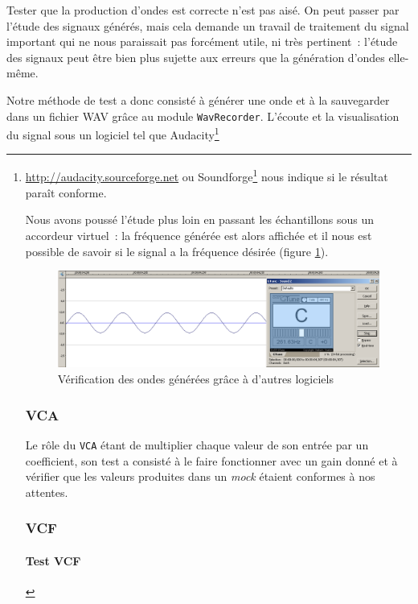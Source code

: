 Tester que la production d'ondes est correcte n'est pas aisé. On
peut passer par l'étude des signaux générés, mais cela demande un
travail de traitement du signal important qui ne nous paraissait
pas forcément utile, ni très pertinent~: l'étude des signaux peut
être bien plus sujette aux erreurs que la génération d'ondes
elle-même.

Notre méthode de test a donc consisté à générer une onde et à la
sauvegarder dans un fichier WAV grâce au module \verb!WavRecorder!.
L'écoute et la visualisation du signal sous un logiciel tel que
Audacity\footnote{\url{http://audacity.sourceforge.net} ou Soundforge\footnote{\url{http://www.sonycreativesoftware.com/soundforgesoftware}} nous indique si le résultat paraît
conforme.

Nous avons poussé l'étude plus loin en passant les échantillons
sous un accordeur virtuel~: la fréquence générée est alors affichée
et il nous est possible de savoir si le signal a la fréquence
désirée (figure \ref{fig:accordeur}).

\begin{figure}[ht]
\centering
\includegraphics[width=16cm]{../img/png/testWaveGeneratorSinus.png}
\caption{Vérification des ondes générées grâce à d'autres logiciels}
\label{fig:accordeur}
\end{figure}

\subsubsection{VCA}
Le rôle du \verb!VCA! étant de multiplier chaque valeur de son entrée par un coefficient, son test a consisté à le faire fonctionner avec un gain donné et à vérifier que les valeurs produites dans un \emph{mock} étaient conformes à nos attentes.

\subsubsection{VCF}

\paragraph{Test VCF}

}
